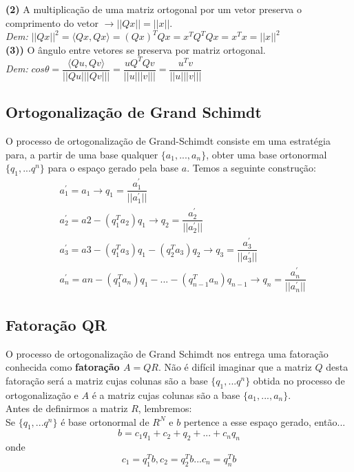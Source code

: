 \documentclass[12pt]{article}
\begin{document}
	\textbf{(2)} A multiplicação de uma matriz ortogonal por um vetor preserva o comprimento do vetor $\rightarrow ||Qx||=||x||$. \\
	
	\textit{Dem:} $||Qx||^2 = \langle Qx,Qx \rangle=(Qx)^TQx=x^TQ^TQx=x^Tx=||x||^2$\\
	
	\textbf{(3))} O ângulo entre vetores se preserva por matriz ortogonal.\\
	
	\textit{Dem:} $cos\theta=\dfrac{\langle Qu,Qv \rangle}{||Qu|||Qv|||}=\dfrac{uQ^TQv}{||u|||v|||}=\dfrac{u^Tv}{||u|||v|||}$
	
	\subsection{Ortogonalização de Grand Schimdt}
	
	O processo de ortogonalização de Grand-Schimdt consiste em uma estratégia para, a partir de uma base qualquer $\{a_1,...,a_n\}$, obter uma base ortonormal $\{q_1,...q^n\}$ para o espaço gerado pela base $a$. Temos a seguinte construção:
	\begin{align*}
		&a_1^{'}=a_1 \rightarrow q_1=\dfrac{a_1^{'}}{||a_1^{'}||}\\
		&a_2^{'}=a2-(q_1^Ta_2)q_1 \rightarrow q_2=\dfrac{a_2^{'}}{||a_2^{'}||}\\
		&a_3^{'}=a3-(q_1^Ta_3)q_1 -(q_2^Ta_3)q_2\rightarrow q_3=\dfrac{a_3^{'}}{||a_3^{'}||}\\
		&a_n^{'}=an-(q_1^Ta_n)q_1 -...-(q_{n-1}^Ta_n)q_{n-1}\rightarrow q_n=\dfrac{a_n^{'}}{||a_n^{'}||}
	\end{align*}
	
	
	\subsection{Fatoração QR}
	
	O processo de ortogonalização de Grand Schimdt nos entrega uma fatoração conhecida como \textbf{fatoração $A=QR$}. Não é difícil imaginar que a matriz $Q$ desta fatoração será a matriz cujas colunas são a base $\{q_1,...q^n\}$ obtida no processo de ortogonalização e $A$ é a matriz cujas colunas são a base $\{a_1,...,a_n\}$.\\
	
	Antes de definirmos a matriz $R$, lembremos:\\	
	
	Se $\{q_1,...q^n\}$ é base ortonormal de $R^N$ e $b$ pertence a esse espaço gerado, então...
	\begin{equation*}
		b=c_1q_1+c_2+q_2+...+c_nq_n
	\end{equation*}
	onde
	\begin{equation*}
		c_1=q_1^Tb, c_2=q_2^Tb... c_n=q_n^Tb
	\end{equation*} 
	
\end{document}
